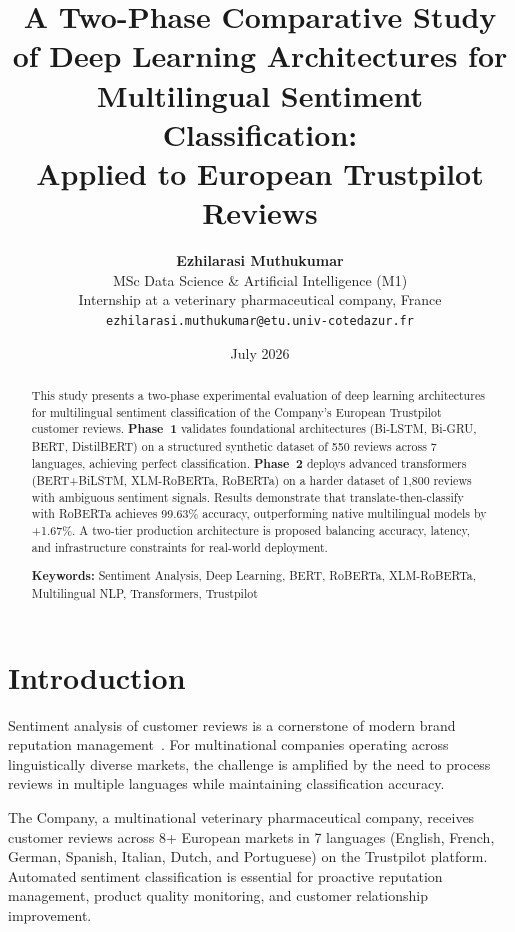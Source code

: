 \documentclass[10pt,twocolumn,a4paper]{article}
\title{\vspace{-1.5cm}\textbf{A Two-Phase Comparative Study of Deep Learning Architectures for Multilingual Sentiment Classification:\\Applied to European Trustpilot Reviews}\vspace{-0.3cm}}
\author{
    \textbf{Ezhilarasi Muthukumar}\\
    \small MSc Data Science \& Artificial Intelligence (M1)\\
    \small Internship at a veterinary pharmaceutical company, France\\
    \small \texttt{ezhilarasi.muthukumar@etu.univ-cotedazur.fr}
}
\date{\small July 2026}
\begin{document}
\maketitle
\thispagestyle{fancy}

\begin{abstract}
\noindent This study presents a two-phase experimental evaluation of deep learning architectures for multilingual sentiment classification of the Company's European Trustpilot customer reviews. \textbf{Phase~1} validates foundational architectures (Bi-LSTM, Bi-GRU, BERT, DistilBERT) on a structured synthetic dataset of 550 reviews across 7 languages, achieving perfect classification. \textbf{Phase~2} deploys advanced transformers (BERT+BiLSTM, XLM-RoBERTa, RoBERTa) on a harder dataset of 1,800 reviews with ambiguous sentiment signals. Results demonstrate that translate-then-classify with RoBERTa achieves 99.63\% accuracy, outperforming native multilingual models by +1.67\%. A two-tier production architecture is proposed balancing accuracy, latency, and infrastructure constraints for real-world deployment.

\medskip
\noindent\textbf{Keywords:} Sentiment Analysis, Deep Learning, BERT, RoBERTa, XLM-RoBERTa, Multilingual NLP, Transformers, Trustpilot
\end{abstract}

\section{Introduction}
\label{sec:intro}

Sentiment analysis of customer reviews is a cornerstone of modern brand reputation management~\cite{liu2012sentiment}. For multinational companies operating across linguistically diverse markets, the challenge is amplified by the need to process reviews in multiple languages while maintaining classification accuracy.

The Company, a multinational veterinary pharmaceutical company, receives customer reviews across 8+ European markets in 7 languages (English, French, German, Spanish, Italian, Dutch, and Portuguese) on the Trustpilot platform. Automated sentiment classification is essential for proactive reputation management, product quality monitoring, and customer relationship improvement.
\end{document}
